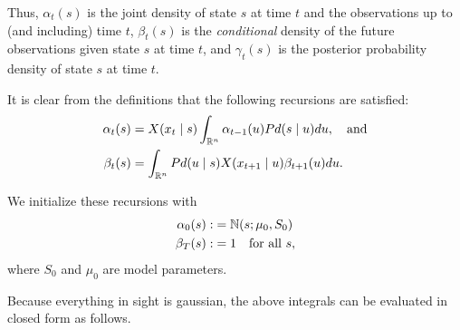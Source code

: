 \documentclass[12pt,leqno]{article}
\begin{document}
Thus, $\alpha_t(s)$ is the joint density of state $s$ at time $t$ and the observations up to (and including) time $t$,
$\beta_t(s)$ is the {\em conditional} density of the future observations given state $s$ at time $t$, and $\gamma_t(s)$
is the posterior probability density of state $s$ at time $t$.

It is clear from the definitions that the following recursions are satisfied:
\begin{align}
\alpha_t(s) &= X(x_t \mid s)\int_{{\mathbb R}^n}\alpha_{t-1}(u)Pd(s \mid u)du,\quad\text{and}\label{alpha:0}\\
\beta_t(s) &= \int_{{\mathbb R}^{n}}Pd(u \mid s)X(x_{t+1} \mid u)\beta_{t+1}(u)du.\label{beta:0}
\end{align}

We initialize these recursions with
\begin{align*}
\alpha_0(s) :&= {\mathbb N}(s;\mu_0,S_0) \\
\beta_{T}(s) :&= 1 \quad\text{for all $s$},
\end{align*}
where $S_0$ and $\mu_0$ are model parameters.

Because everything in sight is gaussian, the above integrals can be evaluated in closed form
as follows.
\end{document}
